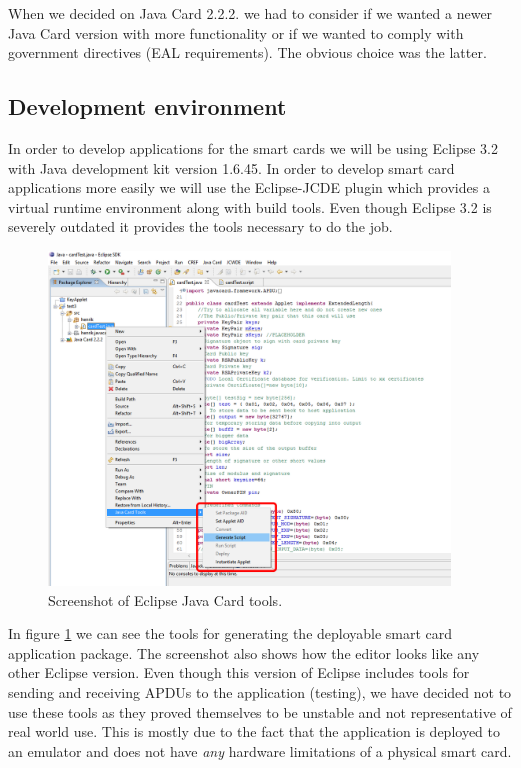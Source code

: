 When we decided on Java Card 2.2.2. we had to consider if we wanted a newer Java Card version with more functionality or if we wanted to comply with government directives (EAL requirements). The obvious choice was the latter.

\subsection{Development environment}
In order to develop applications for the smart cards we will be using Eclipse 3.2 with Java development kit version 1.6.45. In order to develop smart card applications more easily we will use the Eclipse-JCDE plugin \cite{eclipseJCDE} which provides a virtual runtime environment along with build tools. Even though Eclipse 3.2 is severely outdated it provides the tools necessary to do the job.

\begin{figure}[h!]
  \caption{Screenshot of Eclipse Java Card tools.}
  \label{fig:eclipse}
  \centering
    \includegraphics[width=0.95\textwidth]{images/eclipse.png}
\end{figure}

In figure \ref{fig:eclipse} we can see the tools for generating the deployable smart card application package. The screenshot also shows how the editor looks like any other Eclipse version. Even though this version of Eclipse includes tools for sending and receiving APDUs to the application (testing), we have decided not to use these tools as they proved themselves to be unstable and not representative of real world use. This is mostly due to the fact that the application is deployed to an emulator and does not have \textit{any} hardware limitations of a physical smart card.

